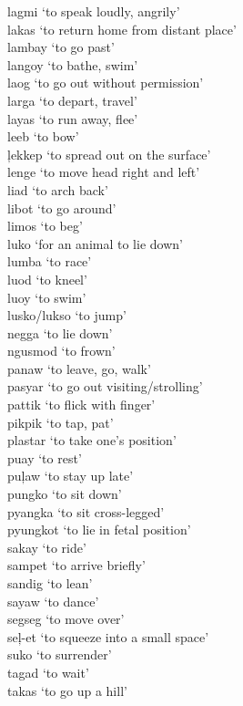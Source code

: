 \begin{multicols}{2}
lagmi ‘to speak loudly, angrily’\\
lakas ‘to return home from distant place’\\
lambay ‘to go past’\\
langoy ‘to bathe, swim’\\
laog ‘to go out without permission’\\
larga ‘to depart, travel’\\
layas ‘to run away, flee’\\
leeb ‘to bow’\\
ļekkep ‘to spread out on the surface’ \\
lenge ‘to move head right and left’\\
liad ‘to arch back’\\
libot ‘to go around’\\
limos ‘to beg’\\
luko ‘for an animal to lie down’\\
lumba ‘to race’\\
luod ‘to kneel’\\
luoy ‘to swim’\\
lusko/lukso ‘to jump’\\
negga ‘to lie down’\\
ngusmod ‘to frown’\\
panaw ‘to leave, go,  walk’\\
pasyar ‘to go out visiting/strolling’\\
pattik ‘to flick with finger’\\
pikpik ‘to tap, pat’\\
plastar ‘to take one’s position’\\
puay ‘to rest’\\
puļaw ‘to stay up late’\\
pungko ‘to sit down’\\
pyangka ‘to sit cross-legged’\\
pyungkot ‘to lie in fetal position’\\
sakay ‘to ride’\\
sampet ‘to arrive briefly’\\
sandig ‘to lean’\\
sayaw ‘to dance’\\
segseg ‘to move over’\\
seļ{}-et ‘to squeeze into a small space’\\
suko ‘to surrender’\\
tagad ‘to wait’\\
takas ‘to go up a hill’\\

\end{multicols}
